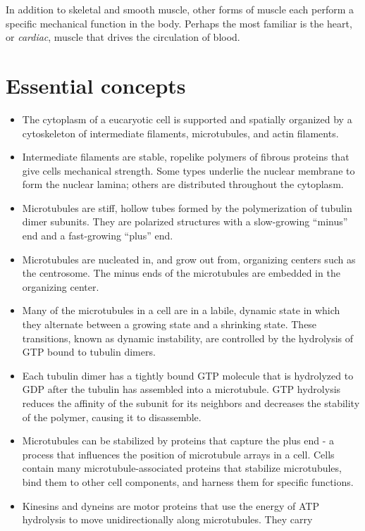 In addition to skeletal and smooth muscle, other forms of muscle each
perform a specific mechanical function in the body. Perhaps the most
familiar is the heart, or \textit{cardiac}, muscle that drives the circulation of
blood.

\section{Essential concepts}

\begin{itemize}
\item The cytoplasm of a eucaryotic cell is supported and spatially organized
by a cytoskeleton of intermediate filaments, microtubules, and
actin filaments.
\item Intermediate filaments are stable, ropelike polymers of fibrous proteins
that give cells mechanical strength. Some types underlie the
nuclear membrane to form the nuclear lamina; others are distributed
throughout the cytoplasm.
\item Microtubules are stiff, hollow tubes formed by the polymerization of
tubulin dimer subunits. They are polarized structures with a slow-growing
“minus” end and a fast-growing “plus” end.
\item Microtubules are nucleated in, and grow out from, organizing centers
such as the centrosome. The minus ends of the microtubules are
embedded in the organizing center.
\item Many of the microtubules in a cell are in a labile, dynamic state in
which they alternate between a growing state and a shrinking state.
These transitions, known as dynamic instability, are controlled by the
hydrolysis of GTP bound to tubulin dimers.
\item Each tubulin dimer has a tightly bound GTP molecule that is hydrolyzed
to GDP after the tubulin has assembled into a microtubule. GTP
hydrolysis reduces the affinity of the subunit for its neighbors and
decreases the stability of the polymer, causing it to disassemble.
\item Microtubules can be stabilized by proteins that capture the plus
end - a process that influences the position of microtubule arrays in
a cell. Cells contain many microtubule-associated proteins that stabilize
microtubules, bind them to other cell components, and harness
them for specific functions.
\item Kinesins and dyneins are motor proteins that use the energy of ATP
hydrolysis to move unidirectionally along microtubules. They carry

\end{itemize}

